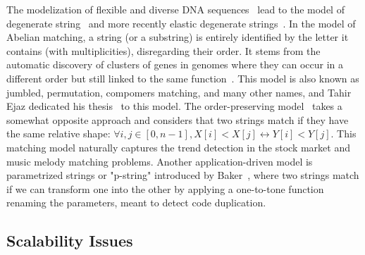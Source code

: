 The modelization of flexible and diverse DNA sequences~\cite{comm1970iupac} lead to the model of degenerate string~\cite{abrahamson1987generalized} and more recently elastic degenerate strings~\cite{iliopoulos2021efficient}.
In the model of Abelian matching, a string (or a substring) is entirely identified by the letter it contains (with multiplicities), disregarding their order. It stems from the automatic discovery of clusters of genes in genomes where they can occur in a different order but still linked to the same function~\cite{eres2004permutation}. This model is also known as jumbled, permutation, compomers matching, and many other names, and Tahir Ejaz dedicated his thesis~\cite{ejaz2010abelian} to this model.
The order-preserving model~\cite{kim2014order,kubica2013linear} takes a somewhat opposite approach and considers that two strings match if they have the same relative shape: $\forall i,j \in [0,n-1], X[i] < X[j] \leftrightarrow Y[i] < Y[j]$. This matching model naturally captures the trend detection in the stock market and music melody matching problems.
%
Another application-driven model is parametrized strings or "p-string" introduced by Baker~\cite{baker1993theory}, where two strings match if we can transform one into the other by applying a one-to-tone function renaming the parameters, meant to detect code duplication.\\


\subsection{Scalability Issues}

 

